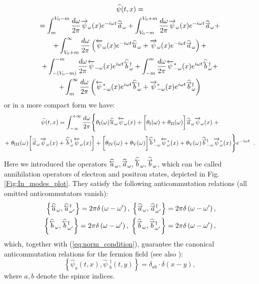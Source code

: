 \documentclass[12pt]{article}
\newcommand\beq{\begin{equation}}
\newcommand\eeq{\end{equation}}
\def\psiwR{\overrightarrow{\psi}_{\omega}}
\def\psiwL{\overleftarrow{\psi}_{\omega}}
\def\hataL{\widehat{ \overset{\smash{\raisebox{-0.45ex}{$\scriptstyle\leftarrow$}}}{a} }}
\def\hatbL{\widehat{ \overset{\smash{\raisebox{-0.5ex}{$\scriptstyle\leftarrow$}}}{b} }}
\def\hataR{\widehat{ \overset{\smash{\raisebox{-0.45ex}{$\scriptstyle\rightarrow$}}}{a} }}
\def\hatbR{\widehat{ \overset{\smash{\raisebox{-0.5ex}{$\scriptstyle\rightarrow$}}}{b} }}
\def\w{\omega}
\def\I{\mathrm{I}}
\def\II{\mathrm{II}}
\def\III{\mathrm{III}}
\def\IV{\mathrm{IV}}
\def\V{\mathrm{V}}
\numberwithin{equation}{section}
\begin{document}
\begin{gather}\label{eq:decomposition_through_regions}
\widehat{\psi}(t,x) 
=\\=
\nonumber
\int_{m}^{V_0-m} \frac{d \omega}{2\pi}  \psiwR(x) e^{-i\omega t} \hataR_{\w}+\int_{V_0-m}^{V_0+m} \frac{d \omega}{2\pi}  \psiwR(x) e^{-i\omega t} \hataR_{\w}+\\+\nonumber \int_{V_0+m}^\infty \frac{d \omega}{2\pi}  \left(\psiwL(x) e^{-i\omega t} \hataL_{\w} + \psiwR(x) e^{-i\omega t} \hataR_{\w}\right)
+\\+ \nonumber
\int_{-(V_0-m)}^{-m} \frac{d \omega}{2\pi}  \overleftarrow{\psi}_{-\omega}(x) e^{i\omega t} \hatbL\phantom{\empty}^{\dagger}_{\w} 
+\int_{-m}^{m} \frac{d \omega}{2\pi} \overleftarrow{\psi}^*_{-\omega}(x) e^{i\omega t} \hatbL\phantom{\empty}^{\dagger}_{\w} + \\+\nonumber \int_m^\infty \frac{d \omega}{2\pi}  \left(\overleftarrow{\psi}^*_{-\omega}(x) e^{i\omega t} \hatbL\phantom{\empty}^{\dagger}_{\w} +\overrightarrow{\psi}^*_{-\omega}(x) e^{i\omega t} \hatbR\phantom{\empty}^{\dagger}_{\w} \right)
\end{gather}
or in a more compact form we have: 
\begin{gather}
\label{eq:fermion_decomposition_static}
    \widehat{\psi}(t,x) = \int_{-\infty}^{+\infty}\frac{d\omega}{2\pi}\Bigg\{\theta_{\I}(\w)\hataL_{\w}\psiwL(x)+ \bigg[\theta_{\I}(\w)+\theta_{\II}(\w)\bigg]\hataR_{\w}\psiwR(x)\; +  
    \\ \nonumber
    +\; 
    \theta_{\III}(\w)\bigg[\hataR_{\w}\psiwR(x) +   \hatbL\phantom{\empty}^{\dagger}_{\w}\psiwL(x)\bigg]+\bigg[\theta_{\IV}(\w)+\theta_{\V}(\w)\bigg]\hatbL\phantom{\empty}^{\dagger}_{-\w}\psiwL^*(x) + \theta_{\V}(\w)\hatbR\phantom{\empty}^{\dagger}_{-\w}\psiwR^*(x)\Bigg\}e^{-i\w t}\;\;.
\end{gather}
Here we introduced the operators $\hataL_{\w}, \hataR_{\w}, \hatbL_{\w}, \hatbR_{\w}$, which can be called annihilation operators of electron and positron states, depicted in Fig.\ref{Fig:In_modes_plot}. They satisfy the following anticommutation relations (all omitted anticommutators vanish):
\beq\label{eq:canonical_relations_opeators}
\begin{aligned}
     \left\{ \hataL_{\w}, \hataL\phantom{\empty}^{\dagger}_{\w'}  \right\} = 2\pi\delta\left(\w-\w'\right), \;
    \left\{ \hataR_{\w}, \hataR\phantom{\empty}^{\dagger}_{\w'}
    \right\} = 2\pi\delta\left(\w-\w'\right), 
    \\
    \left\{ \hatbL_{\w}, \hatbL\phantom{\empty}^{\dagger}_{\w'}  \right\} = 2\pi\delta\left(\w-\w'\right), \;
    \left\{ \hatbR_{\w}, \hatbR\phantom{\empty}^{\dagger}_{\w'}  \right\} = 2\pi\delta\left(\w-\w'\right),
\end{aligned}
\eeq
which, together with (\ref{eq:norm_condition}), guarantee the canonical anticommutation relations for the fermion field (see also \cite{Ochiai:2017slb}):
\beq\label{eq:canonical_relations_fields}
    \left\{ \widehat{\psi}_{a}(t,x), \widehat{\psi}\phantom{.}^{\dagger}_{b}(t,y)  \right\} = \delta_{ab}\cdot\delta\left(x-y\right),
\eeq
where $a,b$ denote the spinor indices.
\end{document}
